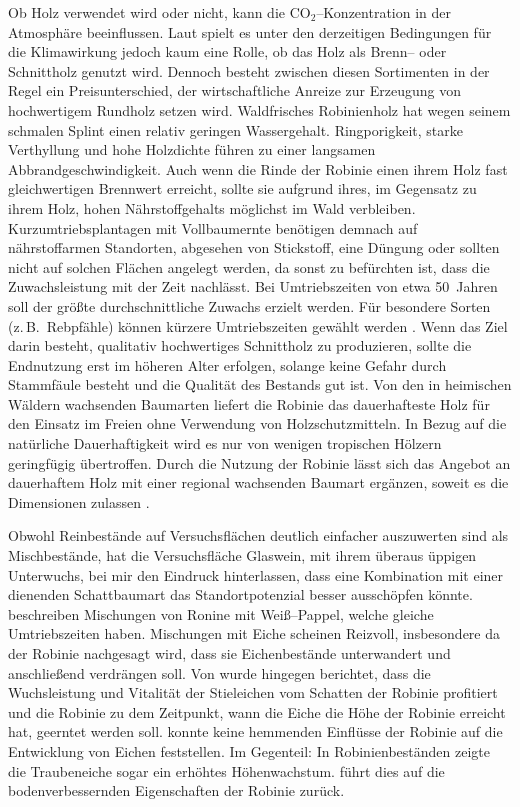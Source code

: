 \documentclass[twocolumn]{scrartcl}
\begin{document}
Ob Holz verwendet wird oder nicht, kann die CO$_2$--Konzentration in
der Atmosphäre beeinflussen. Laut
\citet{boiger2024schnittholzBrennholz} spielt es unter den derzeitigen
Bedingungen für die Klimawirkung jedoch kaum eine Rolle, ob das Holz
als Brenn-- oder Schnittholz genutzt wird. Dennoch besteht zwischen
diesen Sortimenten in der Regel ein Preisunterschied, der
wirtschaftliche Anreize zur Erzeugung von hochwertigem Rundholz setzen
wird. Waldfrisches Robinienholz hat wegen seinem schmalen Splint einen
relativ geringen Wassergehalt.  Ringporigkeit, starke Verthyllung und
hohe Holzdichte führen zu einer langsamen Abbrandgeschwindigkeit.
Auch wenn die Rinde der Robinie einen ihrem Holz fast gleichwertigen
Brennwert erreicht, sollte sie aufgrund ihres, im Gegensatz zu ihrem
Holz, hohen Nährstoffgehalts möglichst im Wald verbleiben.
Kurzumtriebsplantagen mit Vollbaumernte benötigen demnach auf
nährstoffarmen Standorten, abgesehen von Stickstoff, eine Düngung oder
sollten nicht auf solchen Flächen angelegt werden, da sonst zu
befürchten ist, dass die Zuwachsleistung mit der Zeit nachlässt.
Bei Umtriebszeiten von etwa 50~Jahren soll der größte
durchschnittliche Zuwachs erzielt werden.
Für besondere Sorten (z.\,B.\ Rebpfähle) können kürzere Umtriebszeiten
gewählt werden \citep[S.~136]{erteld1952robinieErtrag}.
Wenn das Ziel darin besteht, qualitativ hochwertiges Schnittholz zu
produzieren, sollte die Endnutzung erst im höheren Alter erfolgen,
solange keine Gefahr durch Stammfäule besteht und die Qualität des
Bestands gut ist.
Von den in heimischen Wäldern wachsenden Baumarten liefert
die Robinie das dauerhafteste Holz für den Einsatz im Freien ohne
Verwendung von Holzschutzmitteln. In Bezug auf die natürliche
Dauerhaftigkeit wird es nur von wenigen tropischen Hölzern geringfügig
übertroffen. Durch die Nutzung der Robinie lässt sich das Angebot an
dauerhaftem Holz mit einer regional wachsenden Baumart ergänzen,
soweit es die Dimensionen zulassen
\citep{benthien2020robinieTropenholz,sari2005robinienholz}.

Obwohl Reinbestände auf Versuchsflächen deutlich einfacher auszuwerten sind als Mischbestände,
hat die Versuchsfläche Glaswein, mit ihrem überaus üppigen Unterwuchs, bei mir den Eindruck hinterlassen,
dass eine Kombination mit einer dienenden Schattbaumart das Standortpotenzial besser ausschöpfen könnte.
\citet{redei2006robiniePappel}
beschreiben Mischungen von Ronine mit Weiß--Pappel, welche gleiche
Umtriebszeiten haben. Mischungen mit Eiche scheinen Reizvoll,
insbesondere da der Robinie nachgesagt wird, dass sie Eichenbestände
unterwandert und anschließend verdrängen soll. Von \citet{kallina1888robinie} wurde
hingegen berichtet, dass die Wuchsleistung und Vitalität der
Stieleichen vom Schatten der Robinie profitiert und die Robinie zu dem
Zeitpunkt, wann die Eiche die Höhe der Robinie erreicht hat, geerntet
werden soll. \citet{feher2024robinie} konnte keine hemmenden Einflüsse
der Robinie auf die Entwicklung von Eichen feststellen. Im Gegenteil:
In Robinienbeständen zeigte die Traubeneiche sogar ein erhöhtes
Höhenwachstum. \citet{foeldes1903robinie} führt dies auf die
bodenverbessernden Eigenschaften der Robinie zurück.
\end{document}
